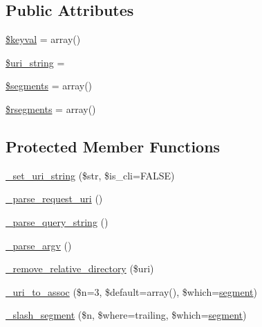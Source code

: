 \subsection*{Public Attributes}
\begin{DoxyCompactItemize}
\item 
\mbox{\hyperlink{class_c_i___u_r_i_ae15942155aae4760439f552ad1fc3c34}{\$keyval}} = array()
\item 
\mbox{\hyperlink{class_c_i___u_r_i_ab908b3e655463a05e8a646c965ca4e53}{\$uri\+\_\+string}} = \textquotesingle{}\textquotesingle{}
\item 
\mbox{\hyperlink{class_c_i___u_r_i_a8d7f597e2b6cf2aaef663822d1b96a82}{\$segments}} = array()
\item 
\mbox{\hyperlink{class_c_i___u_r_i_abf60189292b5fda02cdf36e5d7417a33}{\$rsegments}} = array()
\end{DoxyCompactItemize}
\subsection*{Protected Member Functions}
\begin{DoxyCompactItemize}
\item 
\mbox{\hyperlink{class_c_i___u_r_i_a7c53faa0ca2ee92752a28fc1171961e5}{\+\_\+set\+\_\+uri\+\_\+string}} (\$str, \$is\+\_\+cli=F\+A\+L\+SE)
\item 
\mbox{\hyperlink{class_c_i___u_r_i_ae2e75a6f6657df51c7b6de926979af29}{\+\_\+parse\+\_\+request\+\_\+uri}} ()
\item 
\mbox{\hyperlink{class_c_i___u_r_i_a2bb6abbe64a923ffef79a4a4c3da93db}{\+\_\+parse\+\_\+query\+\_\+string}} ()
\item 
\mbox{\hyperlink{class_c_i___u_r_i_a336e05909197d401613263ebdab6550c}{\+\_\+parse\+\_\+argv}} ()
\item 
\mbox{\hyperlink{class_c_i___u_r_i_a01fdc82a66a1611d3e5d42461c1ad59c}{\+\_\+remove\+\_\+relative\+\_\+directory}} (\$uri)
\item 
\mbox{\hyperlink{class_c_i___u_r_i_a8a4949bcf405b03c1bf2cd94e689a0c7}{\+\_\+uri\+\_\+to\+\_\+assoc}} (\$n=3, \$default=array(), \$which=\textquotesingle{}\mbox{\hyperlink{class_c_i___u_r_i_aeea297fbd38079886a2de35d633c1ed5}{segment}}\textquotesingle{})
\item 
\mbox{\hyperlink{class_c_i___u_r_i_a98974ace6ccf1b5e0923a7de9018095a}{\+\_\+slash\+\_\+segment}} (\$n, \$where=\textquotesingle{}trailing\textquotesingle{}, \$which=\textquotesingle{}\mbox{\hyperlink{class_c_i___u_r_i_aeea297fbd38079886a2de35d633c1ed5}{segment}}\textquotesingle{})
\end{DoxyCompactItemize}
